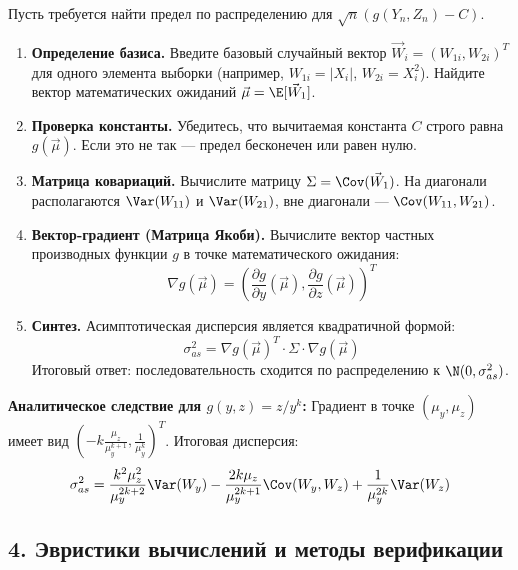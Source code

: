 \begin{MethodBox}
Пусть требуется найти предел по распределению для $\sqrt{n} \left( g(Y_n, Z_n) - C \right)$.

\begin{enumerate}[label=\textbf{\arabic*.}]
    \item \textbf{Определение базиса.} Введите базовый случайный вектор $\vec{W}_i = (W_{1i}, W_{2i})^T$ для одного элемента выборки (например, $W_{1i} = |X_i|$, $W_{2i} = X_i^2$). Найдите вектор математических ожиданий $\vec{\mu} = \E[\vec{W}_1]$.
    
    \item \textbf{Проверка константы.} Убедитесь, что вычитаемая константа $C$ строго равна $g(\vec{\mu})$. Если это не так — предел бесконечен или равен нулю.
    
    \item \textbf{Матрица ковариаций.} Вычислите матрицу $\Sigma = \Cov(\vec{W}_1)$. На диагонали располагаются $\Var(W_{11})$ и $\Var(W_{21})$, вне диагонали — $\Cov(W_{11}, W_{21})$.
    
    \item \textbf{Вектор-градиент (Матрица Якоби).} Вычислите вектор частных производных функции $g$ в точке математического ожидания:
    \[
        \nabla g(\vec{\mu}) = \left( \frac{\partial g}{\partial y}(\vec{\mu}), \frac{\partial g}{\partial z}(\vec{\mu}) \right)^T
    \]
    
    \item \textbf{Синтез.} Асимптотическая дисперсия является квадратичной формой:
    \[
        \sigma^2_{as} = \nabla g(\vec{\mu})^T \cdot \Sigma \cdot \nabla g(\vec{\mu})
    \]
    Итоговый ответ: последовательность сходится по распределению к $\N(0, \sigma^2_{as})$.
\end{enumerate}
\vspace{0.5em}
\textbf{Аналитическое следствие для $g(y, z) = z / y^k$:} Градиент в точке $(\mu_y, \mu_z)$ имеет вид $\left( -k \frac{\mu_z}{\mu_y^{k+1}}, \frac{1}{\mu_y^k} \right)^T$. Итоговая дисперсия:
\[
    \sigma^2_{as} = \frac{k^2 \mu_z^2}{\mu_y^{2k+2}} \Var(W_y) - \frac{2k \mu_z}{\mu_y^{2k+1}} \Cov(W_y, W_z) + \frac{1}{\mu_y^{2k}} \Var(W_z)
\]
\end{MethodBox}

\subsection*{4. Эвристики вычислений и методы верификации}

